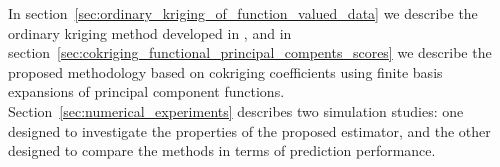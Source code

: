 In section~\ref{sec:ordinary_kriging_of_function_valued_data} we describe the ordinary kriging method developed in \cite{Giraldo:2010jx}, and in section~\ref{sec:cokriging_functional_principal_compents_scores} we describe the proposed methodology based on cokriging coefficients using finite basis expansions of principal component functions. Section~\ref{sec:numerical_experiments} describes two simulation studies: one designed to investigate the properties of the proposed estimator, and the other designed to compare the methods in terms of prediction performance. 




